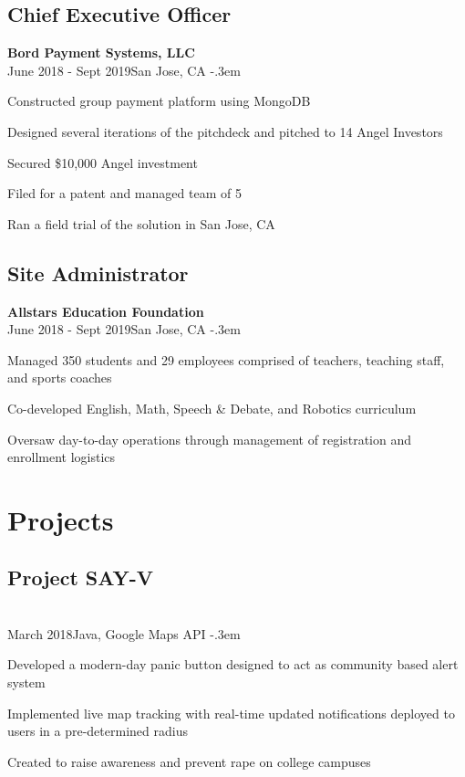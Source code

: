 \documentclass{article}
\let\olditemize=\itemize \let\endolditemize=\enditemize
\renewenvironment{itemize}{\olditemize[topsep=0em] \itemsep-.3em}{\endolditemize}
\newcommand{\entry}[3]{\quad\textbf{#1}\\#2\qquad#3}
\begin{document}
\subsection{Chief Executive Officer}
\entry{Bord Payment Systems, LLC}{June 2018 - Sept 2019}{San Jose, CA}
	\begin{itemize}
		\item Constructed group payment platform using MongoDB
		\item Designed several iterations of the pitchdeck and pitched to 14 Angel Investors
		\item Secured \$10,000 Angel investment
		\item Filed for a patent and managed team of 5
		\item Ran a field trial of the solution in San Jose, CA
	\end{itemize}
\subsection{Site Administrator}
\entry{Allstars Education Foundation}{June 2018 - Sept 2019}{San Jose, CA}
\begin{itemize}
	\item Managed 350 students and 29 employees comprised of teachers, teaching staff, and sports coaches
	\item Co-developed English, Math, Speech \& Debate, and Robotics curriculum
	\item Oversaw day-to-day operations through management of registration and enrollment logistics
\end{itemize}

\section{Projects}
\subsection{Project SAY-V}
\entry{}{March 2018}{Java, Google Maps API}
\begin{itemize}
  \item Developed a modern-day panic button designed to act as community based alert system
  \item Implemented live map tracking with real-time updated notifications deployed to users in a pre-determined radius
  \item Created to raise awareness and prevent rape on college campuses
\end{itemize}
\end{document}
